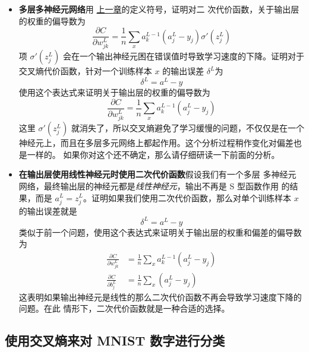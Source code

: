 \begin{itemize}
\item \textbf{多层多神经元网络}\quad 用%
  \hyperref[ch:HowTheBackpropagationAlgorithmWorks]{上一章}的定义符号，证明对二
  次代价函数，关于输出层的权重的偏导数为
  \begin{equation}
    \frac{\partial C}{\partial w^L_{jk}} = \frac{1}{n}
    \sum_x a^{L-1}_k  (a^L_j-y_j) \sigma'(z^L_j)
    \label{eq:65}\tag{65}
  \end{equation}
  项 $\sigma'(z^L_j)$ 会在一个输出神经元困在错误值时导致学习速度的下降。证明对于
  交叉熵代价函数，针对一个训练样本 $x$ 的输出误差 $\delta^L$为
  \begin{equation}
    \delta^L = a^L-y
    \label{eq:66}\tag{66}
  \end{equation}
  使用这个表达式来证明关于输出层的权重的偏导数为
  \begin{equation}
    \frac{\partial C}{\partial w^L_{jk}} = \frac{1}{n} \sum_x
    a^{L-1}_k  (a^L_j-y_j)
    \label{eq:67}\tag{67}
  \end{equation}
  这里 $\sigma'(z^L_j)$ 就消失了，所以交叉熵避免了学习缓慢的问题，不仅仅是在一个
  神经元上，而且在多层多元网络上都起作用。这个分析过程稍作变化对偏差也是一样的。
  如果你对这个还不确定，那么请仔细研读一下前面的分析。
\item \textbf{在输出层使用线性神经元时使用二次代价函数}\quad 假设我们有一个多层
  多神经元网络，最终输出层的神经元都是\emph{线性神经元}，输出不再是 S 型函数作用
  的结果，而是 $a^L_j = z^L_j$。证明如果我们使用二次代价函数，那么对单个训练样本
  $x$ 的输出误差就是
  \begin{equation}
    \delta^L = a^L-y
    \label{eq:68}\tag{68}
  \end{equation}
  类似于前一个问题，使用这个表达式来证明关于输出层的权重和偏差的偏导数为
  \begin{align}
    \frac{\partial C}{\partial w^L_{jk}} &= \frac{1}{n} \sum_x
                                           a^{L-1}_k  (a^L_j-y_j) \label{eq:69}\tag{69}\\
    \frac{\partial C}{\partial b^L_{j}} &= \frac{1}{n} \sum_x
                                          (a^L_j-y_j) \label{eq:70}\tag{70}
  \end{align}
  这表明如果输出神经元是线性的那么二次代价函数不再会导致学习速度下降的问题。在此
  情形下，二次代价函数就是一种合适的选择。
\end{itemize}

\subsection{使用交叉熵来对 MNIST 数字进行分类}

